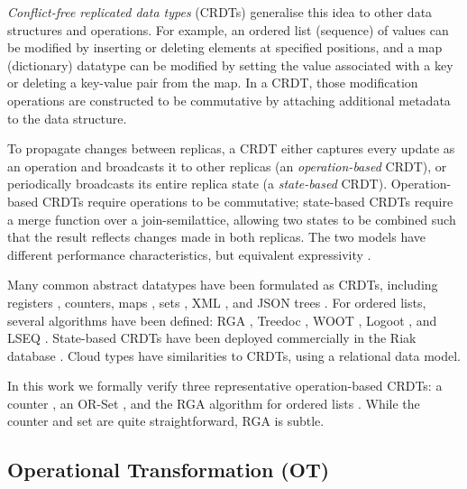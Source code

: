 \emph{Conflict-free replicated data types} (CRDTs) generalise this idea to other data structures and
operations. For example, an ordered list (sequence) of values can be modified by inserting or
deleting elements at specified positions, and a map (dictionary) datatype can be modified by setting
the value associated with a key or deleting a key-value pair from the map. In a CRDT, those
modification operations are constructed to be commutative by attaching additional metadata to the
data structure.

To propagate changes between replicas, a CRDT either captures every update as an operation and
broadcasts it to other replicas (an \emph{operation-based} CRDT), or periodically broadcasts its
entire replica state (a \emph{state-based} CRDT). Operation-based CRDTs require operations to be
commutative; state-based CRDTs require a merge function over a join-semilattice, allowing two states
to be combined such that the result reflects changes made in both replicas. The two models have
different performance characteristics, but equivalent expressivity
\cite{Shapiro:2011wy,Shapiro:2011un}.

Many common abstract datatypes have been formulated as CRDTs, including
registers \cite{Shapiro:2011wy,Shapiro:2011un}, counters, maps \cite{Baquero:2016iv},
sets \cite{Bieniusa:2012wu,Bieniusa:2012gt}, XML \cite{Martin:2010ih},
and JSON trees \cite{Kleppmann:2016ve}. For ordered lists, several algorithms have been defined:
RGA \cite{Roh:2011dw}, Treedoc \cite{Preguica:2009fz}, WOOT \cite{Oster:2006wj},
Logoot \cite{Weiss:2010hx}, and LSEQ \cite{Nedelec:2013ky,Nedelec:2016eo}.
State-based CRDTs have been deployed commercially in the Riak database \cite{Brown:2014hs}.
Cloud types \cite{Burckhardt:2012jy} have similarities to CRDTs, using a relational data model.

In this work we formally verify three representative operation-based CRDTs: a counter
\cite{Shapiro:2011wy}, an OR-Set \cite{Bieniusa:2012gt}, and the RGA algorithm for ordered lists
\cite{Roh:2011dw}. While the counter and set are quite straightforward, RGA is subtle.


\subsection{Operational Transformation (OT)}\label{sect.related.ot}


